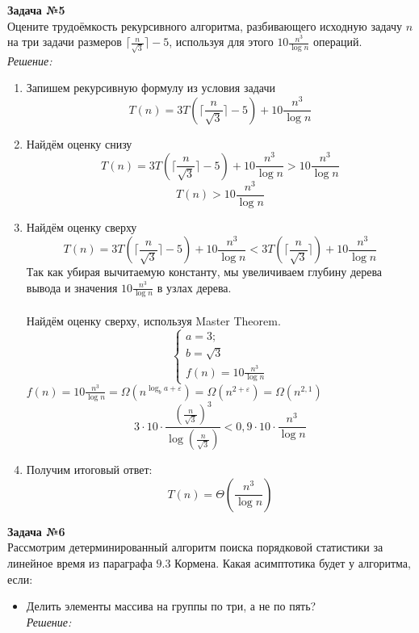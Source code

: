 \documentclass[11pt]{article}
\begin{document}
\textbf{Задача №5}
\\
Оцените трудоёмкость рекурсивного алгоритма, разбивающего исходную задачу $n$ на три задачи размеров $\lceil \frac{n}{\sqrt{3}}\rceil - 5$, используя для этого $10 \frac{n^3}{\log n}$ операций.
	 	\\

{\itshape Решение:}
\\

\begin{enumerate}
	\item Запишем рекурсивную формулу из условия задачи
	\[T(n) = 3 T(\lceil \frac{n}{\sqrt{3}}\rceil - 5) + 10 \frac{n^3}{\log n}\]
	\item Найдём оценку снизу
	\[T(n) = 3 T(\lceil \frac{n}{\sqrt{3}}\rceil - 5) + 10 \frac{n^3}{\log n} > 10 \frac{n^3}{\log n}\]
	\[T(n) > 10 \frac{n^3}{\log n}\]
	\item Найдём оценку сверху
	\[T(n) = 3 T(\lceil \frac{n}{\sqrt{3}}\rceil - 5) + 10 \frac{n^3}{\log n} < 3 T(\lceil \frac{n}{\sqrt{3}}\rceil) + 10 \frac{n^3}{\log n}\]
	Так как убирая вычитаемую константу, мы увеличиваем глубину дерева вывода и значения $10 \frac{n^3}{\log n}$ в узлах дерева.
	\\
	\\
	Найдём оценку сверху, используя Master Theorem.
	\[\begin{cases}
		a = 3; \\
		b = \sqrt{3}\\
		f(n) = 10 \frac{n^3}{\log n}
	\end{cases}
	\]
	$f(n) = 10 \frac{n^3}{\log n} = \Omega (n^{\log_b a + \varepsilon}) = \Omega (n^{2 + \varepsilon}) = \Omega (n^{2,1})$
	\[3\cdot 10 \cdot \frac{(\frac{n}{\sqrt{3}})^3}{\log (\frac{n}{\sqrt{3}})} < 0,9 \cdot 10 \cdot\frac{n^3}{\log n}\]
	\item Получим итоговый ответ:
	\[T(n) = \Theta (\frac{n^3}{\log n}) \]
\end{enumerate}

\textbf{Задача №6}
\\
Рассмотрим детерминированный алгоритм поиска порядковой статистики за линейное время из параграфа $9.3$ Кормена. Какая асимптотика будет у алгоритма, если:
\begin{itemize}
	\item Делить элементы массива на группы по три, а не по пять?
	\\
	
	{\itshape Решение:}
	\\
\end{itemize}
\end{document}
